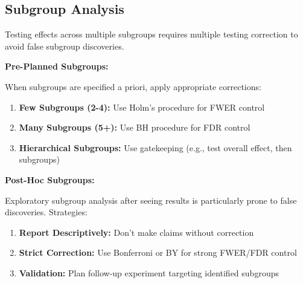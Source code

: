 \subsection{Subgroup Analysis}

Testing effects across multiple subgroups requires multiple testing correction to avoid false subgroup discoveries.

\textbf{Pre-Planned Subgroups:}

When subgroups are specified a priori, apply appropriate corrections:

\begin{enumerate}
    \item \textbf{Few Subgroups (2-4):} Use Holm's procedure for FWER control

    \item \textbf{Many Subgroups (5+):} Use BH procedure for FDR control

    \item \textbf{Hierarchical Subgroups:} Use gatekeeping (e.g., test overall effect, then subgroups)
\end{enumerate}

\textbf{Post-Hoc Subgroups:}

Exploratory subgroup analysis after seeing results is particularly prone to false discoveries. Strategies:

\begin{enumerate}
    \item \textbf{Report Descriptively:} Don't make claims without correction

    \item \textbf{Strict Correction:} Use Bonferroni or BY for strong FWER/FDR control

    \item \textbf{Validation:} Plan follow-up experiment targeting identified subgroups
\end{enumerate}

